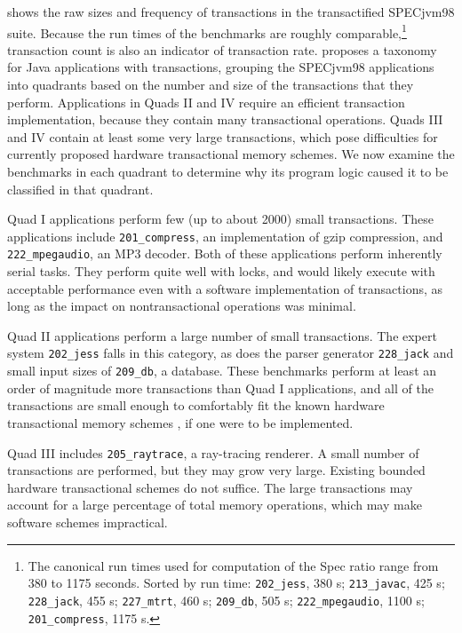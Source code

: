  shows the raw sizes and frequency of transactions in
the transactified SPECjvm98 suite.  Because the run times of the
benchmarks are roughly comparable,\footnote{The canonical run times
  used for computation of the Spec ratio range from 380 to 1175
  seconds.  Sorted by run time: \texttt{202\_jess}, 380 s;
  \texttt{213\_javac}, 425 s; \texttt{228\_jack}, 455 s;
  \texttt{227\_mtrt}, 460 s; \texttt{209\_db}, 505 s;
  \texttt{222\_mpegaudio}, 1100 s; \texttt{201\_compress}, 1175 s.}
transaction count is also an indicator of transaction rate.
 proposes a
taxonomy for Java applications with transactions, grouping the SPECjvm98
applications into quadrants based on the number and size of the
transactions that they perform.  Applications in Quads II and IV
require an efficient transaction implementation, because they contain
many transactional operations.
Quads III and IV contain at least some very large transactions, which
pose difficulties for currently proposed hardware transactional memory
schemes.  We now
examine the benchmarks in each quadrant to determine why its program
logic caused it to be classified in that quadrant.

Quad I applications perform few (up to about 2000) small
transactions.  These applications include \texttt{201\_compress}, an
implementation of gzip compression, and \texttt{222\_mpegaudio}, an
MP3 decoder.  Both of these applications perform inherently serial
tasks.  They perform quite well with locks, and would likely execute
with acceptable performance even with a \naive software
implementation of transactions, as long as the impact on
nontransactional operations was minimal.

Quad II applications perform a large number of small transactions.
The expert system \texttt{202\_jess} falls in this category, as does
the parser generator \texttt{228\_jack} and
small input sizes of \texttt{209\_db}, a database.  These benchmarks
perform at least an order of magnitude more transactions than Quad
I applications, and all of the transactions are small enough to 
comfortably fit the known hardware transactional memory schemes
\cite[etc]{HerlihyMo93}, if
one were to be implemented.

Quad III includes \texttt{205\_raytrace}, a ray-tracing renderer.  A
small number of transactions are performed, but they may grow very
large.  Existing bounded hardware transactional schemes do not
suffice.  The large
transactions may account for a large percentage of total memory
operations, which may make software schemes
impractical.

